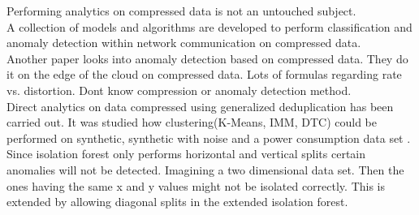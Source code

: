 



Performing analytics on compressed data is not an untouched subject. \\ 

A collection of models and algorithms are developed to perform classification and anomaly detection within network communication on compressed data\cite{related-1}.\\ 

Another paper looks into anomaly detection based on compressed data. They do it on the edge of the cloud on compressed data. Lots of formulas regarding rate vs. distortion. Dont know compression or anomaly detection method\cite{anomaly-det-compressed}. \\ 

Direct analytics on data compressed using generalized deduplication has been carried out. It was studied how clustering(K-Means, IMM, DTC) could be performed on synthetic, synthetic with noise and a power consumption data set \cite{dir-analytics-gd}. \\

Since isolation forest only performs horizontal and vertical splits certain anomalies will not be detected. Imagining a two dimensional data set. Then the ones having the same x and y values might not be isolated correctly. This is extended by allowing diagonal splits in the extended isolation forest\cite{extended-iforest}. 



